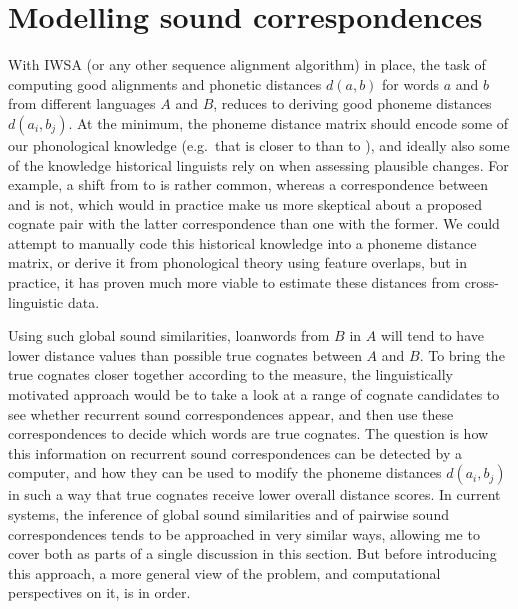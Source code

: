 \section{Modelling sound correspondences}\label{sec:4.4}
With IWSA (or any other sequence alignment algorithm) in place, the task of computing good alignments and phonetic distances $d(a,b)$ for words $a$ and $b$ from different languages $A$ and $B$, reduces to deriving good phoneme distances $d(a_i,b_j)$. At the minimum, the phoneme distance matrix should encode some of our phonological knowledge (e.g.\ that \ipa{[b]} is closer to \ipa{[p]} than to \ipa{[l]}), and ideally also some of the knowledge historical linguists rely on when assessing plausible changes. For example, a shift from \ipa{[s]} to \ipa{[h]} is rather common, whereas a correspondence between \ipa{[s]} and \ipa{[w]} is not, which would in practice make us more skeptical about a proposed cognate pair with the latter correspondence than one with the former. We could attempt to manually code this historical knowledge into a phoneme distance matrix, or derive it from phonological theory using feature overlaps, but in practice, it has proven much more viable to estimate these distances from cross-linguistic data.

Using such global sound similarities, loanwords from $B$ in $A$ will tend to have lower distance values than possible true cognates between $A$ and $B$. To bring the true cognates closer together according to the measure, the linguistically motivated approach would be to take a look at a range of cognate candidates to see whether recurrent sound correspondences appear, and then use these correspondences to decide which words are true cognates. The question is how this information on recurrent sound correspondences can be detected by a computer, and how they can be used to modify the phoneme distances $d(a_i,b_j)$ in such a way that true cognates receive lower overall distance scores. In current systems, the inference of global sound similarities and of pairwise sound correspondences tends to be approached in very similar ways, allowing me to cover both as parts of a single discussion in this section. But before introducing this approach, a more general view of the problem, and computational perspectives on 
it, is in order.

